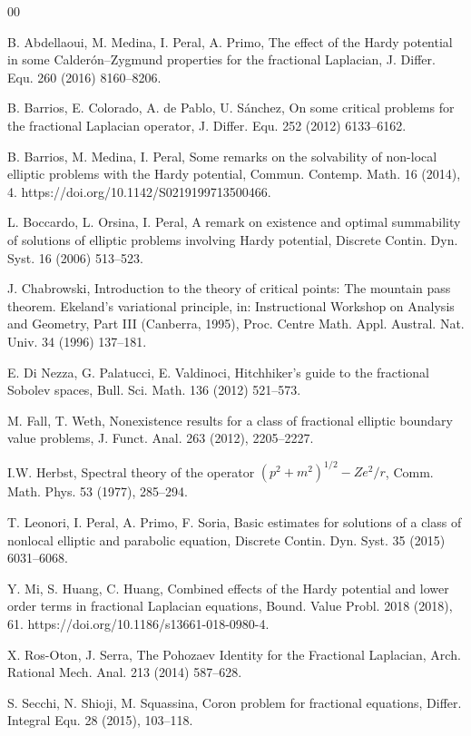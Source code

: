 \documentclass[preprint,12pt]{elsarticle}
\begin{document}
		\begin{thebibliography}{00}
			
			 B. Abdellaoui, M. Medina, I. Peral, A. Primo, The effect of the Hardy potential in some Calder\'on–Zygmund properties for the fractional Laplacian, J. Differ. Equ. 260 (2016) 8160--8206.
			
			 B. Barrios, E. Colorado, A. de Pablo, U. S\'anchez, On some critical problems for the
			fractional Laplacian operator, J. Differ. Equ. 252 (2012) 6133--6162.
			
			 B. Barrios, M. Medina, I. Peral, Some remarks on the solvability of non-local elliptic problems with the Hardy potential, Commun. Contemp. Math. 16 (2014), 4. https://doi.org/10.1142/S0219199713500466.
			
			 L. Boccardo, L. Orsina, I. Peral, A remark on existence and optimal summability of solutions of elliptic problems involving Hardy potential, Discrete Contin. Dyn. Syst. 16 (2006) 513--523.
			
			 J. Chabrowski, Introduction to the theory of critical points: The mountain pass theorem. Ekeland's variational principle, in: Instructional Workshop on Analysis and Geometry, Part III (Canberra, 1995), Proc. Centre Math. Appl. Austral. Nat. Univ. 34 (1996) 137--181.
			
			 E. Di Nezza, G. Palatucci, E. Valdinoci, Hitchhiker’s guide to the fractional Sobolev spaces, Bull. Sci. Math. 136 (2012) 521--573.
			
			 M. Fall, T. Weth, Nonexistence results for a class of fractional elliptic boundary value
			problems, J. Funct. Anal. 263 (2012), 2205--2227.
			
			 I.W. Herbst, Spectral theory of the operator $(p^2+m^2)^{1/2}-Ze^2/r$, Comm. Math. Phys. 53 (1977), 285--294.
			
			 T. Leonori, I. Peral, A. Primo, F. Soria, Basic estimates for solutions of a class of nonlocal elliptic and parabolic equation,  Discrete Contin. Dyn. Syst. 35 (2015) 6031--6068.
			
			 Y. Mi, S. Huang, C. Huang, Combined effects of the Hardy potential and lower order terms in fractional Laplacian equations, Bound. Value Probl. 2018 (2018), 61. https://doi.org/10.1186/s13661-018-0980-4.
			
			 X. Ros-Oton, J. Serra, The Pohozaev Identity for the Fractional Laplacian, Arch. Rational Mech. Anal. 213 (2014) 587--628.
			
			 S. Secchi, N. Shioji, M. Squassina, Coron problem for fractional equations, Differ. Integral Equ. 28 (2015), 103--118.
			
		\end{thebibliography}
	
\end{document}
